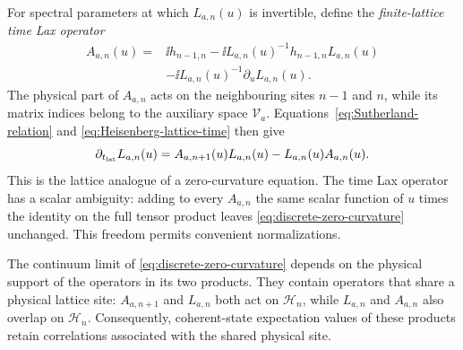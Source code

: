 For spectral parameters at which $L_{a,n}(u)$ is invertible, define the
\emph{finite-lattice time Lax operator}
\begin{align}
A_{a,n}(u)
={}&\ii h_{n-1,n}
-\ii L_{a,n}(u)^{-1}h_{n-1,n}L_{a,n}(u)
\nonumber\\
&-\ii L_{a,n}(u)^{-1}\partial_uL_{a,n}(u).
\label{eq:finite-lattice-time-Lax}
\end{align}
The physical part of $A_{a,n}$ acts on the neighbouring sites
$n-1$ and $n$, while its matrix indices belong to the auxiliary space
$\mathcal V_a$.  Equations~\eqref{eq:Sutherland-relation} and
\eqref{eq:Heisenberg-lattice-time} then give
\begin{equation}
\partial_{t_{\rm lat}}L_{a,n}(u)
=
A_{a,n+1}(u)L_{a,n}(u)
-
L_{a,n}(u)A_{a,n}(u).
\label{eq:discrete-zero-curvature}
\end{equation}
This is the lattice analogue of a zero-curvature equation.  The time Lax
operator has a scalar ambiguity: adding to every $A_{a,n}$ the same
scalar function of $u$ times the identity on the full tensor product leaves
\eqref{eq:discrete-zero-curvature} unchanged.  This freedom permits convenient
normalizations.

The continuum limit of \eqref{eq:discrete-zero-curvature} depends on the
physical support of the operators in its two products.  They contain
operators that share a physical lattice site: $A_{a,n+1}$ and
$L_{a,n}$ both act on $\mathcal H_n$, while $L_{a,n}$ and
$A_{a,n}$ also overlap on $\mathcal H_n$.  Consequently, coherent-state expectation values of these products retain
correlations associated with the shared physical site.
